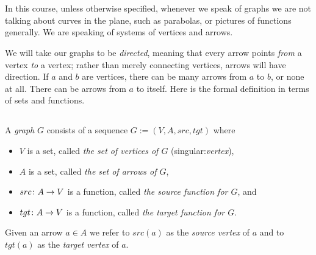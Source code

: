\documentclass[CT4S-EN-RU]{subfiles}
\begin{document}
\section{}\label{sec:graphs}

\begin{blockENG}
In this course, unless otherwise specified, whenever we speak of graphs we are not talking about curves in the plane, such as parabolas, or pictures of functions generally. We are speaking of systems of vertices and arrows.
\end{blockENG}

\begin{blockRUS}
\end{blockRUS}

\begin{blockENG}
We will take our graphs to be {\em directed}, meaning that every arrow points {\em from} a vertex {\em to} a vertex; rather than merely connecting vertices, arrows will have direction. If $a$ and $b$ are vertices, there can be many arrows from $a$ to $b$, or none at all. There can be arrows from $a$ to itself. Here is the formal definition in terms of sets and functions.
\end{blockENG}


\subsection{}

\begin{definitionENG}\label{def:graph}
A {\em graph} $G$ consists of a sequence $G:=(V,A,src,tgt)$ where 
\begin{itemize}
\item $V$ is a set, called {\em the set of vertices of $G$} (singular:{\em vertex}),
\item $A$ is a set, called {\em the set of arrows of $G$},
\item $src\colon A\rightarrow V$ is a function, called {\em the source function for $G$}, and
\item $tgt\colon A\rightarrow V$ is a function, called {\em the target function for $G$}.
\end{itemize}
Given an arrow $a\in A$ we refer to $src(a)$ as the {\em source vertex} of $a$ and to $tgt(a)$ as the {\em target vertex} of $a$.
\end{definitionENG}
\end{document}
